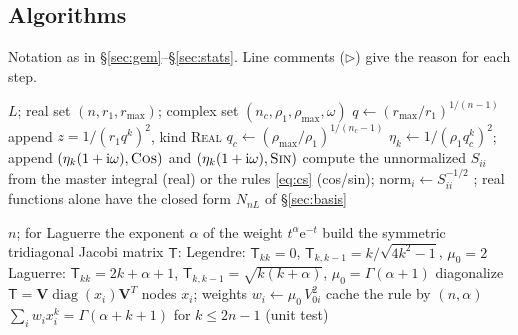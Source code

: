 \documentclass[11pt,a4paper]{article}
\numberwithin{equation}{section}
\theoremstyle{definition}
\theoremstyle{plain}
\theoremstyle{remark}
\numberwithin{algorithm}{section}
\newcommand{\ii}{\mathrm{i}}
\newcommand{\ee}{\mathrm{e}}
\newcommand{\diag}{\operatorname{diag}}
\begin{document}
\subsection{Algorithms}\label{sec:bp-alg}
Notation as in \S\ref{sec:gem}--\S\ref{sec:stats}. Line comments ($\triangleright$) give the reason for each step.

\begin{algorithm}[H]
\caption{Build a basis for one partial wave $L$}\label{alg:basis}
\begin{algorithmic}[1]
\Require $L$; real set $(n,r_1,r_{\max})$; complex set $(n_c,\rho_1,\rho_{\max},\omega)$
\State $q\gets(r_{\max}/r_1)^{1/(n-1)}$
 \State append $z=1/(r_1q^k)^2$, kind \textsc{Real} \EndFor
{}
  \State $q_c\gets(\rho_{\max}/\rho_1)^{1/(n_c-1)}$
   \State $\eta_k\gets1/(\rho_1q_c^k)^2$; append $(\eta_k(1+\ii\omega),\textsc{Cos})$ and $(\eta_k(1+\ii\omega),\textsc{Sin})$ \EndFor
\EndIf
{} 
  \State compute the unnormalized $S_{ii}$ from the master integral (real) or the rules \eqref{eq:cs} (cos/sin); $\text{norm}_i\gets S_{ii}^{-1/2}$
\EndFor
\Ensure {}; real functions alone have the closed form $N_{nL}$ of \S\ref{sec:basis}
\end{algorithmic}
\end{algorithm}

\begin{algorithm}[H]
\caption{Gauss quadrature by Golub--Welsch (Legendre, generalized Laguerre)}\label{alg:gw}
\begin{algorithmic}[1]
\Require $n$; for Laguerre the exponent $\alpha$ of the weight $t^\alpha\ee^{-t}$
\State build the symmetric tridiagonal Jacobi matrix $\mathsf T$:
\Statex \hspace{1.5em} Legendre: $\mathsf T_{kk}=0$, $\mathsf T_{k,k-1}=k/\sqrt{4k^2-1}$, $\mu_0=2$ 
\Statex \hspace{1.5em} Laguerre: $\mathsf T_{kk}=2k+\alpha+1$, $\mathsf T_{k,k-1}=\sqrt{k(k+\alpha)}$, $\mu_0=\Gamma(\alpha+1)$
\State diagonalize $\mathsf T=\mathbf V\diag(x_i)\mathbf V^T$ 
\State nodes $x_i$; weights $w_i\gets\mu_0\,V_{0i}^2$ 
\State cache the rule by $(n,\alpha)$ 
\Ensure $\sum_iw_ix_i^k=\Gamma(\alpha+k+1)$ for $k\le2n-1$ (unit test)
\end{algorithmic}
\end{algorithm}
\end{document}
